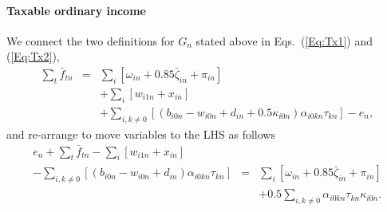 \documentclass{report}[fleqn,11pt]
\begin{document}
\paragraph*{Taxable ordinary income}
	We connect the two definitions for $G_n$ stated above in Eqs.~(\ref{Eq:Tx1}) and (\ref{Eq:Tx2}),
	\begin{eqnarray}
		\sum_t \bar{f}_{tn} &=&
		\sum_i [\omega_{in} + 0.85\bar\zeta_{in} + \pi_{in}]  \nonumber \\
		&& + \sum_i [w_{i1n} + x_{in} ]
		\nonumber\\
		&& + \sum_{i,k\neq 0} [(b_{i0n} - w_{i0n} + d_{in}
		     + 0.5\kappa_{i0n})\alpha_{i0kn}\tau_{kn}] - e_n,
	\end{eqnarray}
	and re-arrange to move variables to the LHS as follows
	\begin{eqnarray}
		\label{Eq:C6}
		e_n + \sum_t \bar{f}_{tn}
		- \sum_i [ w_{i1n} + x_{in}] &&
		\nonumber \\
		- \sum_{i,k\neq 0} [(b_{i0n} - w_{i0n} + d_{in})\alpha_{i0kn}\tau_{kn}] &=&
		\sum_i [\omega_{in} + 0.85\bar\zeta_{in} + \pi_{in} ]
		\nonumber \\
		&& + 0.5\sum_{i,k\neq 0} \alpha_{i0kn}\tau_{kn}\kappa_{i0n}.
	\end{eqnarray}
\end{document}
